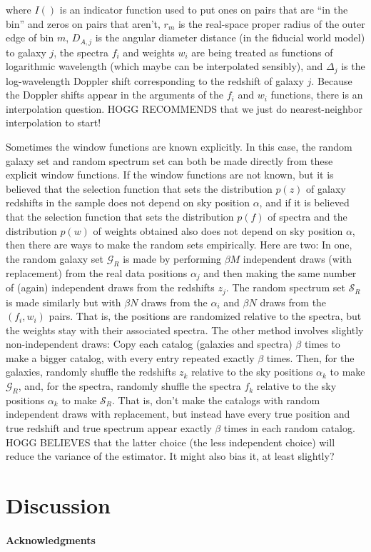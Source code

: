 \documentclass{article}
\newcommand{\set}[1]{\mathscr{#1}}
\begin{document}
where
$I()$ is an indicator function used to put ones on pairs that are ``in the bin'' and zeros on pairs that aren't,
$r_m$ is the real-space proper radius of the outer edge of bin $m$,
$D_{A,j}$ is the angular diameter distance (in the fiducial world model) to galaxy $j$,
the spectra $f_i$ and weights $w_i$ are being treated as functions of logarithmic wavelength (which maybe can be interpolated sensibly),
and $\Delta_j$ is the log-wavelength Doppler shift corresponding to the redshift of galaxy $j$.
Because the Doppler shifts appear in the arguments of the $f_i$ and $w_i$ functions, there is an interpolation question.
HOGG RECOMMENDS that we just do nearest-neighbor interpolation to start!

Sometimes the window functions are known explicitly.
In this case, the random galaxy set and random spectrum set can both be made directly from these explicit window functions.
If the window functions are not known, but it is believed that the selection function that sets the distribution $p(z)$ of galaxy redshifts in the sample does not depend on sky position $\alpha$, and if it is believed that the selection function that sets the distribution $p(f)$ of spectra and the distribution $p(w)$ of weights obtained also does not depend on sky position $\alpha$, then there are ways to make the random sets empirically.
Here are two:
In one, the random galaxy set $\set{G}_R$ is made by performing $\beta M$ independent draws (with replacement) from the real data positions $\alpha_j$ and then making the same number of (again) independent draws from the redshifts $z_j$.
The random spectrum set $\set{S}_R$ is made similarly but with $\beta N$ draws from the $\alpha_i$ and $\beta N$ draws from the $(f_i, w_i)$ pairs.
That is, the positions are randomized relative to the spectra, but the weights stay with their associated spectra.
The other method involves slightly non-independent draws:
Copy each catalog (galaxies and spectra) $\beta$ times to make a bigger catalog, with every entry repeated exactly $\beta$ times.
Then, for the galaxies, randomly shuffle the redshifts $z_k$ relative to the sky positions $\alpha_k$ to make $\set{G}_R$,
and, for the spectra, randomly shuffle the spectra $f_k$ relative to the sky positions $\alpha_k$ to make $\set{S}_R$. 
That is, don't make the catalogs with random independent draws with replacement, but instead have every true position and true redshift and true spectrum appear exactly $\beta$ times in each random catalog.
HOGG BELIEVES that the latter choice (the less independent choice) will reduce the variance of the estimator.
It might also bias it, at least slightly?

\section{Discussion}\label{sec:discussion}

\paragraph{Acknowledgments}


\end{document}
